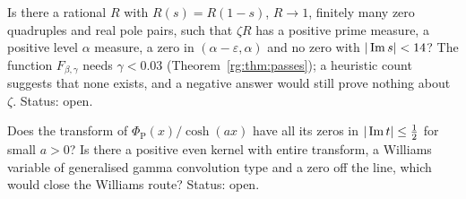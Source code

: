 \begin{problem}\label{rg:prob:modif}
Is there a rational $R$ with $R(s)=R(1-s)$, $R\to1$, finitely many zero quadruples and real pole pairs, such that $\zeta R$ has a positive prime measure, a positive level $\alpha$ measure, a zero in $(\alpha-\varepsilon,\alpha)$ and no zero with $|\operatorname{Im} s|<14$? The function $F_{\beta,\gamma}$ needs $\gamma<0.03$ (Theorem~\ref{rg:thm:passes}); a heuristic count suggests that none exists, and a negative answer would still prove nothing about $\zeta$. Status: open.
\end{problem}

\begin{problem}\label{rg:prob:cosh}
Does the transform of $\Phi_{\mathrm P}(x)/\cosh(ax)$ have all its zeros in $|\operatorname{Im} t|\le\frac12$ for small $a>0$? Is there a positive even kernel with entire transform, a Williams variable of generalised gamma convolution type and a zero off the line, which would close the Williams route? Status: open.
\end{problem}

